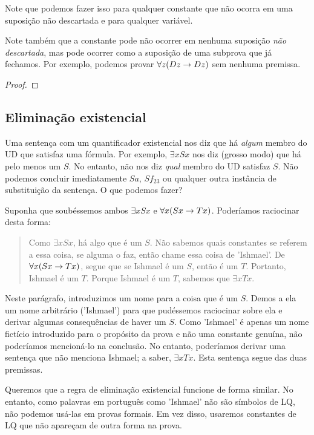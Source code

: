 Note que podemos fazer isso para qualquer constante que não ocorra em uma suposição não descartada e para qualquer variável.

Note também que a constante pode não ocorrer em nenhuma suposição \emph{não descartada}, mas pode ocorrer como a suposição de uma subprova que já fechamos. Por exemplo, podemos provar $\forall z(Dz \rightarrow Dz)$ sem nenhuma premissa.

\begin{proof}
	\open
	\close
\end{proof}


\subsection{Eliminação existencial}
Uma sentença com um quantificador existencial nos diz que há \emph{algum} membro do UD que satisfaz uma fórmula. Por exemplo, $\exists x Sx$ nos diz (grosso modo) que há pelo menos um $S$. No entanto, não nos diz \emph{qual} membro do UD satisfaz $S$. Não podemos concluir imediatamente $Sa$, $Sf_{23}$ ou qualquer outra instância de substituição da sentença. O que podemos fazer?

Suponha que soubéssemos ambos $\exists x Sx$ e $\forall x(Sx \rightarrow Tx)$. Poderíamos raciocinar desta forma:
\begin{quote}
Como $\exists x Sx$, há algo que é um $S$. Não sabemos quais constantes se referem a essa coisa, se alguma o faz, então chame essa coisa de 'Ishmael'. De $\forall x(Sx \rightarrow Tx)$, segue que se Ishmael é um $S$, então é um $T$. Portanto, Ishmael é um $T$.  Porque Ishmael é um $T$, sabemos que $\exists x Tx$.
\end{quote}
Neste parágrafo, introduzimos um nome para a coisa que é um $S$. Demos a ela um nome arbitrário ('Ishmael') para que pudéssemos raciocinar sobre ela e derivar algumas consequências de haver um $S$. Como 'Ishmael' é apenas um nome fictício introduzido para o propósito da prova e não uma constante genuína, não poderíamos mencioná-lo na conclusão. No entanto, poderíamos derivar uma sentença que não menciona Ishmael; a saber, $\exists x Tx$. Esta sentença segue das duas premissas.

Queremos que a regra de eliminação existencial funcione de forma similar. No entanto, como palavras em português como 'Ishmael' não são símbolos de LQ, não podemos usá-las em provas formais. Em vez disso, usaremos constantes de LQ que não apareçam de outra forma na prova.


